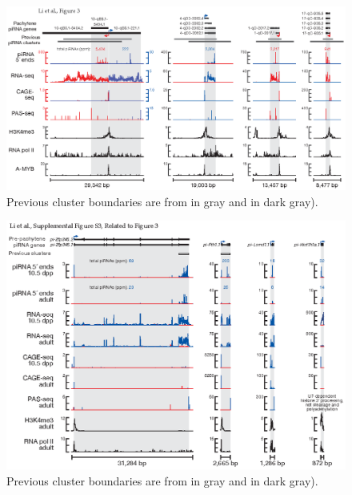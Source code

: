     \begin{landscape}
    \begin{figure} %
      \centering 
      \includegraphics{Figures/MolCel/MolCel2013_Fig3.eps}
      \caption[Examples of Pachytene piRNA Genes]
      {
	      Previous cluster boundaries are from \citet{Lau2006} in gray and \citet{Girard2006} in  dark gray).
      	}
     	\label{MolCel:fig:MolCelF3}
   		\end{figure}

    \begin{figure} %
      \centering 
      \includegraphics{Figures/MolCel/MolCel2013_FigS3.eps}
      \caption[Examples of Pre-Pachytene piRNA Genes]
      {
      	Previous cluster boundaries are from \citet{Lau2006} in gray and \citet{Girard2006} in  dark gray).
      	}
      \label{MolCel:fig:MolCelS3}
    	\end{figure}
    \end{landscape}

